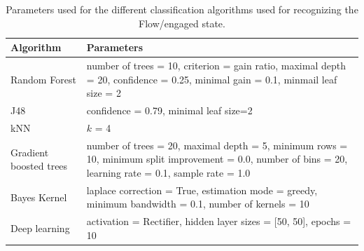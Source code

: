 \documentclass[a4paper,twoside]{article}
\begin{document}
% 
\begin{table}[!t]
\centering
\caption{Parameters used for the different classification algorithms
  used for recognizing the Flow/engaged state.}
\label{tab_params_ml}
    \begin{tabular}{ | l | p{10cm} |  }
\hline
      Algorithm & Parameters \\
      \hline 
      Random Forest &  number of trees = 10, 
criterion = gain ratio, maximal depth = 20, 
                      confidence = 0.25, minimal gain = 0.1, minmail leaf size = 2 \\
      J48 &  confidence = 0.79, minimal leaf size=2 \\
      kNN & $k$ = 4 \\
      Gradient boosted trees & number of trees = 20,  maximal depth = 5, minimum rows = 10, 
minimum split 
improvement = 0.0, number of bins = 20, 
                               learning rate = 0.1, sample rate = 1.0 \\
      Bayes Kernel & laplace correction = True, estimation mode = greedy, 
                     minimum bandwidth = 0.1, number of kernels = 10 \\
      Deep learning & activation = Rectifier, hidden layer sizes =
                      [50, 50], epochs = 10 \\
      \hline
    \end{tabular}
  \end{table}
      
\end{document}
